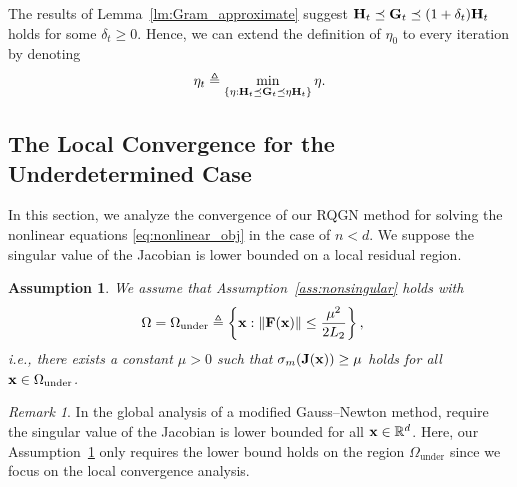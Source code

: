 \documentclass[11pt]{article}
\theoremstyle{plain}
\newtheorem{assumption}[theorem]{Assumption}
\theoremstyle{definition}
\theoremstyle{remark}
\newtheorem{remark}[theorem]{Remark}
\theoremstyle{plain}
\def\F{{\bf F}}
\def\G{{\bf G}}
\def\H{{\bf H}}
\def \J{{\bf J}}
\def\x{{\bf x}}
\def\RB{{\mathbb R}}
\begin{document}
The results of Lemma~\ref{lm:Gram_approximate} suggest  $\H_t\preceq\G_t\preceq(1+\delta_t)\H_t$ holds for some  $\delta_t\geq 0$.
Hence, we can extend the definition of $\eta_0$ to every iteration by denoting
\begin{align}
\label{eq:def_eta}
    \eta_t\triangleq \min_{\{\eta: 
 \H_t\preceq\G_t\preceq \eta\H_t\}}\eta.
\end{align}


\subsection{The Local Convergence for the Underdetermined Case}
\label{sec:underde}
In this section, we analyze the convergence of our RQGN method for solving the nonlinear equations  \eqref{eq:nonlinear_obj} in the case of $n<d$.
We suppose the singular value of the Jacobian is lower bounded on a local residual region.
\begin{assumption}
\label{ass:Omegan<d}
    We assume that Assumption~\ref{ass:nonsingular} holds with
    \begin{align*}
    \Omega
    &=\Omega_{\mathrm{under}}
    \triangleq\left\{\x:\|\F(\x)\|\leq\frac{\mu^2}{2L_2}\right\},
    \end{align*}
    i.e., there exists a constant $\mu>0$ such that $\sigma_m(\J(\x))\geq \mu$ holds for all $\x\in\Omega_{\mathrm{under}}$.
\end{assumption}
\begin{remark}
   In the global analysis of a modified Gauss--Newton method, \citet{nesterov2007modified} require the singular value of the Jacobian is lower bounded for all $\x\in\RB^d$.
   Here, our Assumption~\ref{ass:Omegan<d} only requires the lower bound holds on the region $\Omega_{\mathrm{under}}$ since we focus on the local convergence analysis.
\end{remark}

\end{document}
